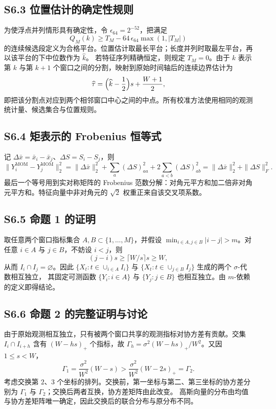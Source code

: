 \documentclass[UTF8,zihao=-4]{ctexart}
\theoremstyle{remark}
\begin{document}
\subsection*{S6.3 位置估计的确定性规则}
为使浮点并列情形具有确定性，令 $\epsilon_{64}=2^{-52}$，把满足
\[
 Q_M(k)\ge T_M-64\,\epsilon_{64}\max(1,|T_M|)
\]
的连续候选段定义为合格平台。位置估计取最长平台；长度并列时取最左平台，再以该平台的下中位数作为 $\widehat k$。
若特征序列精确恒定，则规定 $T_M=0$。由于 $k$ 表示第 $k$ 与第 $k+1$ 个窗口之间的分割，映射到原始时间轴后的连续边界估计为
\[
 \widehat\tau=\Bigl(\widehat k-\frac12\Bigr)s+\frac{W+1}{2},
\]
即把该分割点对应到两个相邻窗口中心之间的中点。所有校准方法使用相同的观测统计量、候选集合与位置规则。

\subsection*{S6.4 矩表示的 Frobenius 恒等式}
记 $\Delta\bar x=\bar x_i-\bar x_j$、$\Delta S=S_i-S_j$，则
\[
 \|Y_i^{\mathrm{MOM}}-Y_j^{\mathrm{MOM}}\|_2^2
 =\|\Delta\bar x\|_2^2+\sum_{a}(\Delta S)_{aa}^2+2\sum_{a<b}(\Delta S)_{ab}^2
 =\|\Delta\bar x\|_2^2+\|\Delta S\|_F^2 .
\]
最后一个等号用到实对称矩阵的 Frobenius 范数分解：对角元平方和加二倍非对角元平方和。特征向量中非对角元的 $\sqrt2$ 权重正来自该交叉项系数。

\subsection*{S6.5 命题 1 的证明}
取任意两个窗口指标集合 $A,B\subset\{1,\ldots,M\}$，并假设 $\min_{i\in A,j\in B}|i-j|>m$。对任意 $i\in A$ 与 $j\in B$，不妨设 $i<j$，则
\[
 (j-i)s\ge\lceil W/s\rceil s\ge W,
\]
从而 $I_i\cap I_j=\varnothing$。因此 $\{X_t:t\in\cup_{i\in A}I_i\}$ 与 $\{X_t:t\in\cup_{j\in B}I_j\}$ 生成的两个 $\sigma$-代数相互独立，
其固定可测函数 $\{Y_i:i\in A\}$ 与 $\{Y_j:j\in B\}$ 也相互独立。由 $m$-依赖的定义即得结论。

\subsection*{S6.6 命题 2 的完整证明与讨论}
由于原始观测相互独立，只有被两个窗口共享的观测指标对协方差有贡献。交集 $I_i\cap I_{i+h}$ 含有 $(W-hs)_+$ 个指标，故
$\Gamma_h=\sigma^2(W-hs)_+/W^2$。又因 $1\le s<W$，
\[
 \Gamma_1=\frac{\sigma^2}{W^2}(W-s)>\frac{\sigma^2}{W^2}(W-2s)_+=\Gamma_2 .
\]
考虑交换第 $2$、$3$ 个坐标的排列。交换前，第一坐标与第二、第三坐标的协方差分别为 $\Gamma_1$ 与 $\Gamma_2$；交换后两者互换，协方差矩阵由此改变。
高斯向量的分布由均值与协方差矩阵唯一确定，因此交换后的联合分布与原分布不同。
\end{document}
